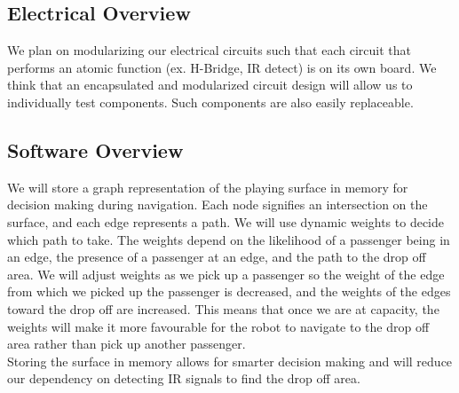 \documentclass[12pt]{article}
\begin{document}
\subsection{Electrical Overview}
\par We plan on modularizing our electrical circuits such that each circuit that
performs an atomic function (ex. H-Bridge, IR detect) is on its own board.  We
think that an encapsulated and modularized circuit design will allow us to
individually test components.  Such components are also easily replaceable.
\subsection{Software Overview}
\par We will store a graph representation of the playing surface in memory for
decision making during navigation. Each node signifies an intersection on the
surface, and each edge represents a path. We will use dynamic weights to decide
which path to take.  The weights depend on the likelihood of a passenger being
in an edge, the presence of a passenger at an edge, and the path to the drop off
area.  We will adjust weights as we pick up a passenger so the weight of the
edge from which we picked up the passenger is decreased, and the weights of the
edges toward the drop off are increased.  This means that once we are at
capacity, the weights will make it more favourable for the robot to navigate to
the drop off area rather than pick up another passenger.\\

Storing the surface in memory allows for smarter decision making and will reduce
our dependency on detecting IR signals to find the drop off area.
\end{document}
